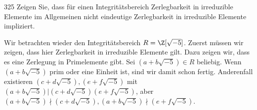 \begin{algebraUE}{325}
Zeigen Sie, dass für einen Integritätsbereich Zerlegbarkeit in
irreduzible Elemente im Allgemeinen nicht eindeutige Zerlegbarkeit in
irreduzible Elemente impliziert.
\end{algebraUE}
\begin{solution}
Wir betrachten wieder den Integritätsbereich $R = \Z[\sqrt{-5}]$.
Zuerst müssen wir zeigen, dass hier Zerlegbarkeit in irreduzible Elemente gilt.
Dazu zeigen wir, dass es eine Zerlegung in Primelemente gibt.
Sei $(a + b\sqrt{-5}) \in R$ beliebig. Wenn $(a + b\sqrt{-5})$ prim oder eine Einheit
ist, sind wir damit schon fertig. Anderenfall existieren $(c + d\sqrt{-5}),(e + f\sqrt{-5})$
mit $(a + b\sqrt{-5})|(c + d\sqrt{-5})(e + f\sqrt{-5})$, aber
$(a + b\sqrt{-5})\nmid (c + d\sqrt{-5}), (a + b\sqrt{-5})\nmid (e + f\sqrt{-5})$.
\end{solution}
